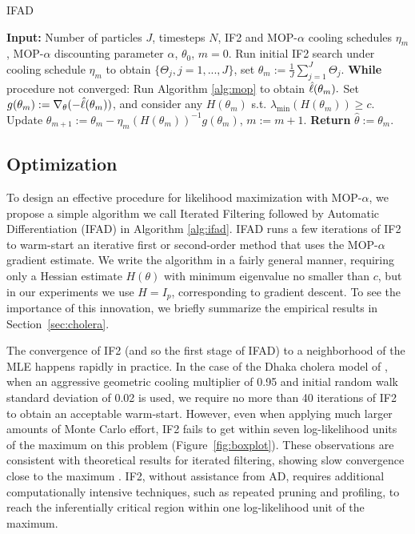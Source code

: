 \documentclass[numsec,webpdf,modern,medium,namedate]{oup-authoring-template}
\theoremstyle{thmstyleone}%
\theoremstyle{thmstyletwo}%
\theoremstyle{thmstylethree}%
\begin{document}
\begin{algorithm}[htbp!]
	\caption{IFAD}
    \label{alg:ifad}
	    \textbf{Input:} Number of particles $J$, timesteps $N$, IF2 and MOP-$\alpha$ cooling schedules $\eta_m$, MOP-$\alpha$ discounting parameter $\alpha$, $\theta_0$, $m=0.$\newline
        Run initial IF2 search under cooling schedule $\eta_m$ to obtain $\{\Theta_j, j=1,...,J\}$, set $\theta_m := \frac{1}{J}\sum_{j=1}^J \Theta_j.$\newline
		\textbf{While} procedure not converged: \newline
		\hspace*{4mm} Run Algorithm \ref{alg:mop} to obtain $\hat{\ell}(\theta_m).$ \newline
		\hspace*{4mm} Set $g(\theta_m) := \nabla_{\theta}(-\hat{\ell}(\theta_m))$, and consider any $H(\theta_m)$ s.t. $\lambda_{\min}(H(\theta_m)) \geq c$. \newline
		\hspace*{4mm} Update $\theta_{m+1} := \theta_m - \eta_m (H(\theta_m))^{-1} g(\theta_m)$, $m:=m+1.$ \newline
		\textbf{Return} $\hat{\theta} := \theta_m.$
\end{algorithm}


\subsection{Optimization}

To design an effective procedure for likelihood maximization with MOP-$\alpha$, we propose a simple algorithm we call Iterated Filtering followed by Automatic Differentiation (IFAD) in Algorithm \ref{alg:ifad}. IFAD runs a few iterations of IF2 to warm-start an iterative first or second-order method that uses the MOP-$\alpha$ gradient estimate.
We write the algorithm in a fairly general manner, requiring only a Hessian estimate $H(\theta)$ with minimum eigenvalue no smaller than $c$, but in our experiments we use $H=I_p$, corresponding to gradient descent.
To see the importance of this innovation, we briefly summarize the empirical results in Section~\ref{sec:cholera}.

The convergence of IF2 (and so the first stage of IFAD) to a neighborhood of the MLE happens rapidly in practice. 
In the case of the Dhaka cholera model of \cite{king08}, when an aggressive geometric cooling multiplier of 0.95 and initial random walk standard deviation of 0.02 is used, we require no more than 40 iterations of IF2 to obtain an acceptable warm-start. 
However, even when applying much larger amounts of Monte Carlo effort, IF2 fails to get within seven log-likelihood units of the maximum on this problem (Figure~\ref{fig:boxplot}).
These observations are consistent with theoretical results for iterated filtering, showing slow convergence close to the maximum \citep{doucet15-if}.
IF2, without assistance from AD, requires additional computationally intensive techniques, such as repeated pruning and profiling, to reach the inferentially critical region within one log-likelihood unit of the maximum.
\end{document}
